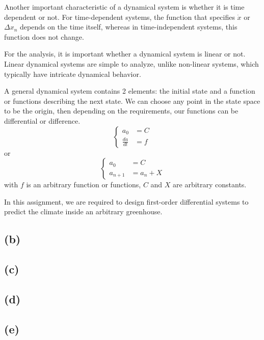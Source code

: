 \documentclass[a4paper]{article}
\begin{document}
Another important characteristic of a dynamical system is whether it is time dependent or not.
For time-dependent systems, the function that specifies \(\dot{x}\) or \(\Delta{x_n}\) depends on the time itself, whereas in time-independent systems, this function does not change.

For the analysis, it is important whether a dynamical system is linear or not.
Linear dynamical systems are simple to analyze, unlike non-linear systems, which typically have intricate dynamical behavior.

A general dynamical system contains 2 elements: the initial state and a function or functions describing the next state.
We can choose any point in the state space to be the origin, then depending on the requirements, our functions can be differential or difference.
\begin{equation}
  \begin{cases}
    a_0           & = C \\
    \frac{da}{dt} & = f
  \end{cases}
\end{equation}
or
\begin{equation}
  \begin{cases}
    a_0       & = C       \\
    a_{n + 1} & = a_n + X
  \end{cases}
\end{equation}
with \(f\) is an arbitrary function or functions, \(C\) and \(X\) are arbitrary constants.

In this assignment, we are required to design first-order differential systems to predict the climate inside an arbitrary greenhouse.

\subsection{(b)}

\subsection{(c)}

\subsection{(d)}

\subsection{(e)}
\end{document}
